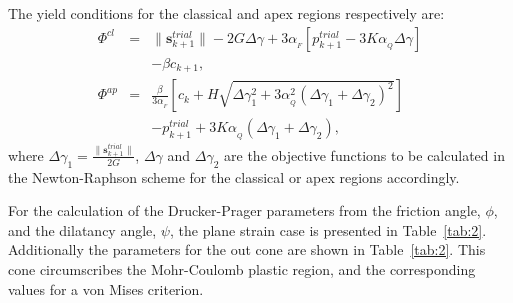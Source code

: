 \documentclass[twocolumn]{svjour3}          %
\begin{document}
{The yield conditions for the classical and apex regions respectively are:
\begin{eqnarray}
\Phi^{cl} &=&\|\textbf{s}^{trial}_{k+1}\| - 2G\Delta\gamma + 3\alpha_{_F}[p^{trial}_{k+1}- 3K\alpha_{_Q}\Delta\gamma]
\nonumber\\\label{eq_dp9}
&&-\beta c_{k+1}, \\
\Phi^{ap}&=&\frac{\beta}{3\alpha_{_F}}\left[c_k+H\sqrt{\Delta\gamma_1^2 + 3\alpha_{_Q}^2(\Delta\gamma_1+\Delta\gamma_2)^2} \right]
\nonumber\\\label{eq_dp10}
&&- p^{trial}_{k+1}  
+3K\alpha_{_Q}\left(\Delta\gamma_1+\Delta\gamma_2 \right),
\end{eqnarray}
where $\Delta\gamma_1=\frac{\|\textbf{s}^{trial}_{k+1}\|}{2G}$, $\Delta\gamma$ and $\Delta\gamma_2$ are the objective functions to be calculated in the Newton-Raphson scheme for the classical or apex regions accordingly.

For the calculation of the Drucker-Prager parameters from the friction angle, $\phi$, and the dilatancy angle, $\psi$, the plane strain case is presented in  Table~\ref{tab:2}. Additionally the parameters for the out cone are shown in Table~\ref{tab:2}. This cone circumscribes the Mohr-Coulomb plastic region, and the corresponding values for a von Mises criterion. 
}
\end{document}
